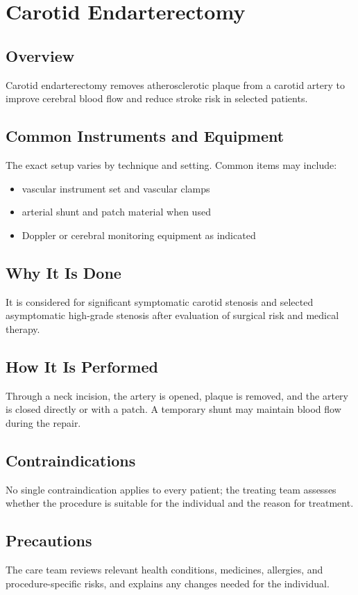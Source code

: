\chapter{Carotid Endarterectomy}
\section*{Overview}
Carotid endarterectomy removes atherosclerotic plaque from a carotid artery to improve cerebral blood flow and reduce stroke risk in selected patients.
\section*{Common Instruments and Equipment}
The exact setup varies by technique and setting. Common items may include:
\begin{itemize}[nosep,leftmargin=*]
  \item vascular instrument set and vascular clamps
  \item arterial shunt and patch material when used
  \item Doppler or cerebral monitoring equipment as indicated
\end{itemize}

\section*{Why It Is Done}
It is considered for significant symptomatic carotid stenosis and selected asymptomatic high-grade stenosis after evaluation of surgical risk and medical therapy.
\section*{How It Is Performed}
Through a neck incision, the artery is opened, plaque is removed, and the artery is closed directly or with a patch. A temporary shunt may maintain blood flow during the repair.
\section*{Contraindications}
No single contraindication applies to every patient; the treating team assesses whether the procedure is suitable for the individual and the reason for treatment.

\section*{Precautions}
The care team reviews relevant health conditions, medicines, allergies, and procedure-specific risks, and explains any changes needed for the individual.

